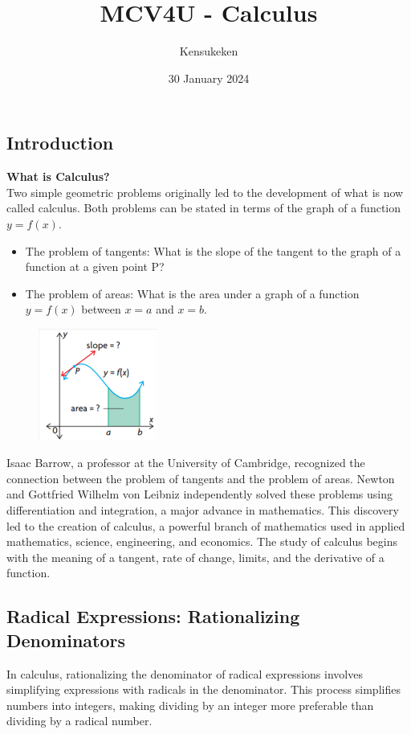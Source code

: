 \documentclass{article}
\title{MCV4U - Calculus}
\author{Kensukeken}
\date{30 January 2024}
\begin{document}
\maketitle

\tableofcontents
\newpage




\subsection{Introduction}
\textbf{What is Calculus?}\\
Two simple geometric problems originally led to the development of what is now called calculus. Both problems can be stated in terms of the graph of a function $y=f(x)$.
\begin{itemize}
    \item The problem of tangents: What is the slope of the tangent to the graph of a function at a given point P?
    \item The problem of areas: What is the area under a graph of a function $y=f(x)$ between $x=a$ and $x=b$.
\end{itemize}
    \begin{figure}[ht]
    \centering
    \includegraphics[width=0.35\textwidth]{imgs/Chapter 1 - MCV4U Nelson.png}
    \end{figure}
Isaac Barrow, a professor at the University of Cambridge, recognized the connection between the problem of tangents and the problem of areas. Newton and Gottfried Wilhelm von Leibniz independently solved these problems using differentiation and integration, a major advance in mathematics. This discovery led to the creation of calculus, a powerful branch of mathematics used in applied mathematics, science, engineering, and economics. The study of calculus begins with the meaning of a tangent, rate of change, limits, and the derivative of a function.
\newpage

\subsection*{Radical Expressions: Rationalizing Denominators}
In calculus, rationalizing the denominator of radical expressions involves simplifying expressions with radicals in the denominator. This process simplifies numbers into integers, making dividing by an integer more preferable than dividing by a radical number. \\ 
\end{document}
